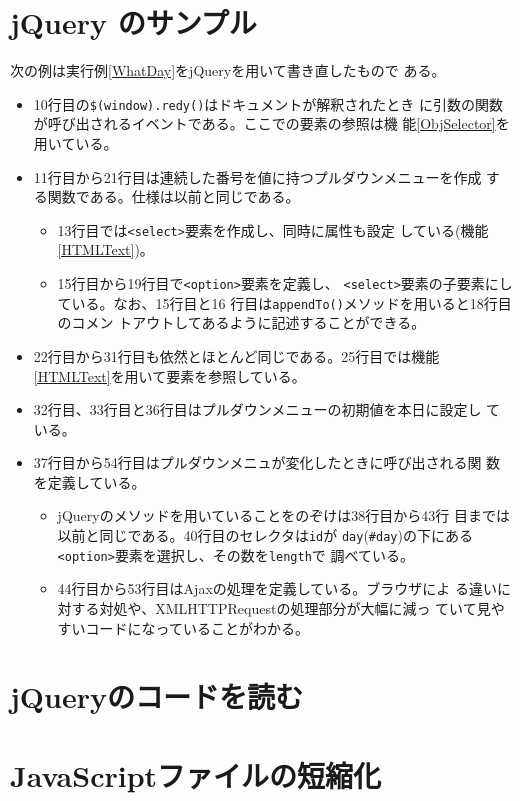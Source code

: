 \section{jQuery のサンプル}
 \begin{Exec}\upshape
  次の例は実行例\ref{WhatDay}をjQueryを用いて書き直したもので
 ある。
 \begin{itemize}
  \item 10行目の\texttt{\$(window).redy()}はドキュメントが解釈されたとき
	に引数の関数が呼び出されるイベントである。ここでの要素の参照は機
	能\ref{ObjSelector}を用いている。
  \item 11行目から21行目は連続した番号を値に持つプルダウンメニューを作成
	する関数である。仕様は以前と同じである。
	\begin{itemize}
	 \item 13行目では\texttt{<select>}要素を作成し、同時に属性も設定
	       している(機能\ref{HTMLText})。
	 \item 15行目から19行目で\texttt{<option>}要素を定義し、
	       \texttt{<select>}要素の子要素にしている。なお、15行目と16
	       行目は\texttt{appendTo()}メソッドを用いると18行目のコメン
	       トアウトしてあるように記述することができる。
	\end{itemize}
  \item 22行目から31行目も依然とほとんど同じである。25行目では機能
	\ref{HTMLText}を用いて要素を参照している。
  \item 32行目、33行目と36行目はプルダウンメニューの初期値を本日に設定し
	ている。
  \item 37行目から54行目はプルダウンメニュが変化したときに呼び出される関
	数を定義している。
	\begin{itemize}
	 \item jQueryのメソッドを用いていることをのぞけは38行目から43行
	       目までは以前と同じである。40行目のセレクタは\texttt{id}が
	       \texttt{day}(\texttt{\#day})の下にある
	       \texttt{<option>}要素を選択し、その数を\texttt{length}で
	       調べている。
	 \item 44行目から53行目はAjaxの処理を定義している。ブラウザによ
	       る違いに対する対処や、XMLHTTPRequestの処理部分が大幅に減っ
	       ていて見やすいコードになっていることがわかる。
	\end{itemize}
 \end{itemize}
 \end{Exec}
\section{jQueryのコードを読む}

\section{JavaScriptファイルの短縮化}


